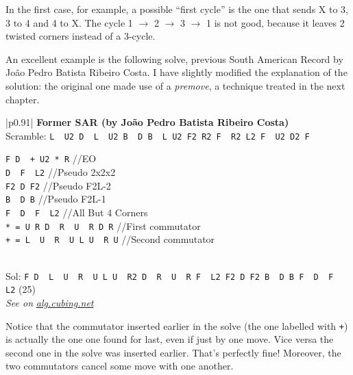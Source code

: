 \documentclass[11pt,a4paper]{book}
\newcommand{\p}{\textquotesingle}
\newcommand{\m}{\texttt}
\newcommand{\ps}{\p\,\,}
\newcommand{\comment}[1]{{\color{gray}\quad//#1}}
\begin{document}
In the first case, for example, a possible ``first cycle'' is the one that sends X to 3, 3 to 4 and 4 to X. The cycle 1 $\to$ 2 $\to$ 3 $\to$ 1 is not good, because it leaves 2 twisted corners instead of a 3-cycle.

An excellent example is the following solve, previous South American Record by Jo\~ao Pedro Batista Ribeiro Costa. I have slightly modified the explanation of the solution: the original one made use of a \emph{premove}, a technique treated in the next chapter.

\bigskip
\begin{tabular}{|p{}|}
\hline
\textbf{Former SAR (by Jo\~ao Pedro Batista Ribeiro Costa)}\\
\hline
Scramble: \m{L\ps U2 D\ps L\ps U2 B\ps D B\ps L U2 F2 R2 F\ps R2 L2 F\ps U2 D2 F}\\
\hline
\begin{minipage}[l]{0.650\textwidth}
\m{F D\ps + U2 * R} \comment{EO}\\
\m{D\ps F\ps L2} \comment{Pseudo 2x2x2}\\
\m{F2 D F2} \comment{Pseudo F2L-2}\\
\m{B\ps D B} \comment{Pseudo F2L-1}\\
\m{F\ps D\ps F\ps L2} \comment{All But 4 Corners}\\
\m{* = U R D\ps R\ps U\ps R D R\p} \comment{First commutator}\\
\m{+ = L\ps U\ps R\ps U L U\ps R U} \comment{Second commutator}
\end{minipage}
\begin{minipage}[c]{0.25\textwidth}

\end{minipage}\\
\hline
Sol: \m{F D\ps L\ps U\ps R\ps U L U\ps R2 D\ps R\ps U\ps R F\ps L2 F2 D F2 B\ps D B F\ps D\ps F\ps L2} (25)\\
\hline
\emph{See on }\href{https://alg.cubing.net/?alg=F_D-_(L-_U-_R-_U_L_U-_R_U)_U2_(U_R_D-_R-_U-_R_D_R-)_R_\%2F\%2FEO\%0AD-_F-_L2_\%2F\%2F2x2x2\%0AF2_D_F2_\%2F\%2FPseudo_F2L\%26\%2345\%3B2\%0AB-_D_B_\%2F\%2FF2L\%26\%2345\%3B1\%0AF-_D-_F-_\%2F\%2FAll_But_4_Corners&setup=_L_U2_D-_L-_U2_B-_D_B-_L_U2_F2_R2_F-_R2_L2_F-_U2_D2_F}{\emph{alg.cubing.net}}\\
\hline
\end{tabular}
\bigskip

Notice that the commutator inserted earlier in the solve (the one labelled with \m +) is actually the one one found for last, even if just by one move. Vice versa the second one in the solve was inserted earlier. That's perfectly fine!
Moreover, the two commutators cancel some move with one another.
\end{document}
